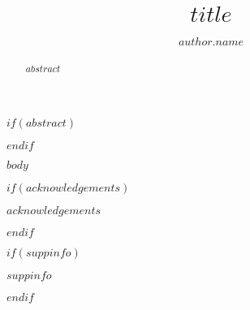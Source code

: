 \documentclass[journal=jacsat,manuscript=article]{achemso}
\author{$author.name$}
\title[the Title]
  {$title$}
\begin{document}

$if(abstract)$
\begin{abstract}
    $abstract$
\end{abstract}
$endif$


$body$

$if(acknowledgements)$
\begin{acknowledgement}
$acknowledgements$
\end{acknowledgement}
$endif$

$if(suppinfo)$
\begin{suppinfo}
$suppinfo$
\end{suppinfo}
$endif$


\end{document}
